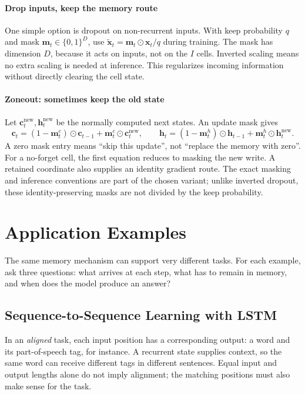 \documentclass[11pt, oneside]{book}
\let\originalsection\section
\renewcommand{\section}{\Needspace{7\baselineskip}\originalsection}
\let\originalsubsection\subsection
\renewcommand{\subsection}{\Needspace{6\baselineskip}\originalsubsection}
\begin{document}
\paragraph{Drop inputs, keep the memory route} One simple option is dropout on non-recurrent inputs. With keep probability $q$ and mask $\mathbf{m}_t\in\{0,1\}^D$, use $\widetilde{\mathbf{x}}_t=\mathbf{m}_t\odot\mathbf{x}_t/q$ during training. The mask has dimension $D$, because it acts on inputs, not on the $I$ cells. Inverted scaling means no extra scaling is needed at inference. This regularizes incoming information without directly clearing the cell state.

\paragraph{Zoneout: sometimes keep the old state} Let $\mathbf{c}^{\mathrm{new}}_t,\mathbf{h}^{\mathrm{new}}_t$ be the normally computed next states. An update mask gives
\[
 \mathbf{c}_t=(1-\mathbf{m}^c_t)\odot\mathbf{c}_{t-1}
                   +\mathbf{m}^c_t\odot\mathbf{c}^{\mathrm{new}}_t,
\qquad
 \mathbf{h}_t=(1-\mathbf{m}^h_t)\odot\mathbf{h}_{t-1}
                   +\mathbf{m}^h_t\odot\mathbf{h}^{\mathrm{new}}_t.
\]
A zero mask entry means ``skip this update'', not ``replace the memory with zero''. For a no-forget cell, the first equation reduces to masking the new write. A retained coordinate also supplies an identity gradient route. The exact masking and inference conventions are part of the chosen variant; unlike inverted dropout, these identity-preserving masks are not divided by the keep probability.

\section{Application Examples}\label{sec:source-3-5}
The same memory mechanism can support very different tasks. For each example, ask three questions: what arrives at each step, what has to remain in memory, and when does the model produce an answer?

\subsection{Sequence-to-Sequence Learning with LSTM}\label{sec:source-3-5-1}
In an \emph{aligned} task, each input position has a corresponding output: a word and its part-of-speech tag, for instance. A recurrent state supplies context, so the same word can receive different tags in different sentences. Equal input and output lengths alone do not imply alignment; the matching positions must also make sense for the task.
\end{document}

